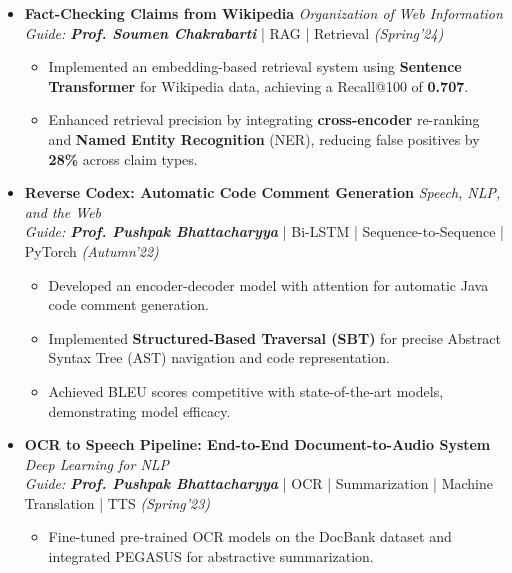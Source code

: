 \documentclass[a4paper,10pt]{article}
\begin{document}
\begin{itemize}[noitemsep,nolistsep]
\vspace{0.2cm}
\item \textbf{Fact-Checking Claims from Wikipedia}  \hfill {\emph{Organization of Web Information}}\\
\emph{Guide: \textbf{Prof. Soumen Chakrabarti}} | RAG | Retrieval \hfill
\emph{(Spring'24)}
\vspace{0.1cm}
\begin{itemize}[noitemsep,nolistsep]
    \item Implemented an embedding-based retrieval system using \textbf{Sentence Transformer} for Wikipedia data, achieving a Recall@100 of \textbf{0.707}.
    \vspace{0.07cm}
    \item Enhanced retrieval precision by integrating \textbf{cross-encoder} re-ranking and \textbf{Named Entity Recognition} (NER), reducing false positives by \textbf{28\%} across claim types.
\end{itemize}
\vspace{0.2cm}
\item \textbf{Reverse Codex: Automatic Code Comment Generation} \hfill {\emph{Speech, NLP, and the Web}}\\
\emph{Guide: \textbf{Prof. Pushpak Bhattacharyya}} | Bi-LSTM | Sequence-to-Sequence | PyTorch\hfill
\emph{(Autumn'22)}
\vspace{0.1cm}
\begin{itemize}[noitemsep,nolistsep]
    \item Developed an encoder-decoder model with attention for automatic Java code comment generation.
    \vspace{0.07cm}
    \item Implemented \textbf{Structured-Based Traversal (SBT)} for precise Abstract Syntax Tree (AST) navigation and code representation.
    \vspace{0.07cm}
    \item Achieved BLEU scores competitive with state-of-the-art models, demonstrating model efficacy.
\end{itemize}

\item \textbf{OCR to Speech Pipeline: End-to-End Document-to-Audio System} \hfill {\emph{Deep Learning for NLP}}\\
\emph{Guide: \textbf{Prof. Pushpak Bhattacharyya}} | OCR | Summarization | Machine Translation | TTS \hfill
\emph{(Spring'23)}
\begin{itemize}[noitemsep,nolistsep]
\vspace{0.1cm}
    \item Fine-tuned pre-trained OCR models on the DocBank dataset and integrated PEGASUS for abstractive summarization.
    \vspace{0.07cm}
    

\end{itemize}
\end{itemize}
\end{document}
